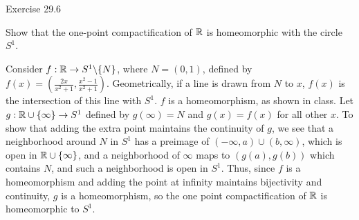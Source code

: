 \documentclass{hmwk}
\begin{document}
\begin{problem}{Exercise 29.6}

    \pre Show that the one-point compactification of $\mathbb{R}$ is homeomorphic with the circle $S^1$.
\end{problem}

\begin{solution}

    \pre Consider $f: \mathbb{R} \rightarrow S^1\backslash \{N\}$, where $N = (0, 1)$, defined by $f(x) = \left(\frac{2x}{x^2 + 1}, \frac{x^2 - 1}{x^2 + 1}\right)$. Geometrically, if a line is drawn from $N$ to $x$, $f(x)$ is the intersection of this line with $S^1$. $f$ is a homeomorphism, as shown in class. Let $g: \mathbb{R} \cup \{\infty\} \rightarrow S^1$ defined by $g(\infty) = N$ and $g(x) = f(x)$ for all other $x$. To show that adding the extra point maintains the continuity of $g$, we see that a neighborhood around $N$ in $S^1$ has a preimage of $(-\infty, a) \cup (b, \infty)$, which is open in $\mathbb{R} \cup \{\infty\}$, and a neighborhood of $\infty$ maps to $(g(a), g(b))$ which contains $N$, and such a neighborhood is open in $S^1$. Thus, since $f$ is a homeomorphism and adding the point at infinity maintains bijectivity and continuity, $g$ is a homeomorphism, so the one point compactification of $\mathbb{R}$ is homeomorphic to $S^1$. 
\end{solution}
\end{document}
